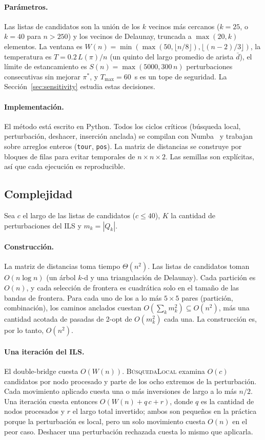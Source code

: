 \documentclass[runningheads]{llncs}
\begin{document}
\paragraph{Parámetros.}
Las listas de candidatos son la unión de los $k$ vecinos más cercanos
($k=25$, o $k=40$ para $n>250$) y los vecinos de Delaunay, truncada a
$\max(20,k)$ elementos. La ventana es
$W(n)=\min(\max(50,\lfloor n/8\rfloor),\lfloor(n-2)/3\rfloor)$, la
temperatura es $T=0.2\,L(\pi)/n$ (un quinto del largo promedio de arista
$\bar d$), el límite de estancamiento es $S(n)=\max(5000,300\,n)$
perturbaciones consecutivas sin mejorar $\pi^*$, y $T_{\max}=60$~s es un
tope de seguridad. La Sección~\ref{sec:sensitivity} estudia estas
decisiones.

\paragraph{Implementación.}
El método está escrito en Python. Todos los ciclos críticos (búsqueda
local, perturbación, deshacer, inserción anclada) se compilan con
Numba~\cite{lam2015numba} y trabajan sobre arreglos enteros
(\texttt{tour}, \texttt{pos}). La matriz de distancias se construye por
bloques de filas para evitar temporales de $n\times n\times 2$. Las
semillas son explícitas, así que cada ejecución es reproducible.

\subsection{Complejidad}
\label{sec:complexity}

Sea $c$ el largo de las listas de candidatos ($c\le 40$), $K$ la cantidad
de perturbaciones del ILS y $m_k=|Q_k|$.

\paragraph{Construcción.} La matriz de distancias toma tiempo
$\Theta(n^2)$. Las listas de candidatos toman $O(n\log n)$ (un árbol
$k$-d y una triangulación de Delaunay). Cada partición es $O(n)$, y cada
selección de frontera es cuadrática solo en el tamaño de las bandas de
frontera. Para cada uno de los a lo más $5\times5$ pares (partición,
combinación), los caminos anclados cuestan $O(\sum_k m_k^2)\subseteq
O(n^2)$, más una cantidad acotada de pasadas de 2-opt de $O(m_k^2)$ cada
una. La construcción es, por lo tanto, $O(n^2)$.

\paragraph{Una iteración del ILS.} El double-bridge cuesta $O(W(n))$.
\textsc{BúsquedaLocal} examina $O(c)$ candidatos por nodo procesado y
parte de los ocho extremos de la perturbación. Cada movimiento aplicado
cuesta una o más inversiones de largo a lo más $n/2$. Una iteración
cuesta entonces $O(W(n)+q\,c+r)$, donde $q$ es la cantidad de nodos
procesados y $r$ el largo total invertido; ambos son pequeños en la
práctica porque la perturbación es local, pero un solo movimiento cuesta
$O(n)$ en el peor caso. Deshacer una perturbación rechazada cuesta lo
mismo que aplicarla.
\end{document}
